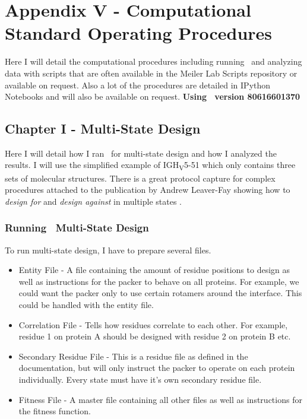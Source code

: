 \section{Appendix V - Computational Standard Operating Procedures}
\label{sec:appenixV}
Here I will detail the computational procedures including running \rosetta~and analyzing data with scripts that are often available in the Meiler Lab Scripts repository or available on request. Also a lot of the procedures are detailed in IPython Notebooks and will also be available on request. \textbf{Using \rosetta~version 80616601370}

\subsection{Chapter I - Multi-State Design}
Here I will detail how I ran \rosettadesign~for multi-state design and how I analyzed the results. I will use the simplified example of IGH\textsubscript{V}5-51 which only contains three sets of molecular structures. There is a great protocol capture for complex procedures attached to the publication by Andrew Leaver-Fay showing how to \textit{design for} and \textit{design against} in multiple states \citep{LeaverFay:2011ji}.
\subsubsection{Running \rosetta~Multi-State Design}
To run multi-state design, I have to prepare several files.

\begin{itemize}
\item Entity File - A file containing the amount of residue positions to design as well as instructions for the packer to behave on all proteins. For example, we could want the packer only to use certain rotamers around the interface. This could be handled with the entity file.
\item Correlation File - Tells how residues correlate to each other. For example, residue 1 on protein A should be designed with residue 2 on protein B etc.
\item Secondary Residue File - This is a residue file as defined in the documentation, but will only instruct the packer to operate on each protein individually. Every state must have it's own secondary residue file.
\item Fitness File - A master file containing all other files as well as instructions for the fitness function.
\end{itemize}

